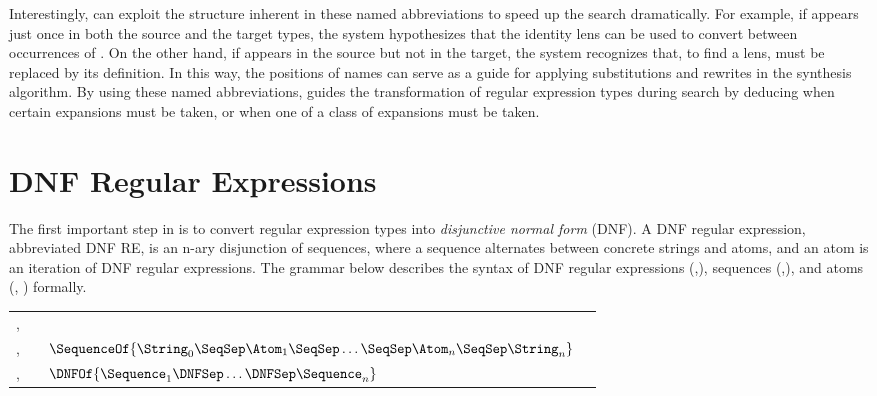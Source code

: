 \documentclass[acmsmall,screen]{acmart}
\begin{document}
Interestingly, \Optician{} can exploit the structure inherent in these named
abbreviations to speed up the search dramatically.  For example, if
\TextChar{} appears just once in both the source and the target types, the system
hypothesizes that the identity lens can be used to convert between
occurrences of \TextChar{}.  On the other hand, if \TextChar{} appears in the
source but not in the target, the system recognizes that, to find a lens,
\TextChar{} must be replaced by its
definition.  In this way, the positions of names
can serve as a guide for applying substitutions and rewrites in the
synthesis algorithm.  By using these named abbreviations, \TypeProp{} guides the 
transformation of regular expression types
during search by deducing when certain expansions must be taken, or when one of
a class of expansions must be taken.



\section{DNF Regular Expressions}
\label{sec:dnfre}

The first important step in \Optician{} is to convert
regular expression types into \emph{disjunctive normal form} (DNF).
A DNF regular expression, abbreviated DNF RE, is an n-ary disjunction of
sequences, where a sequence alternates between concrete strings and
atoms, and an atom is an iteration of DNF regular expressions.
The grammar below describes the syntax of 
DNF regular expressions (\DNFRegex{},\DNFRegexAlt{}),
sequences (\Sequence{},\SequenceAlt{}), and atoms (\Atom, \AtomAlt)
formally.

\begin{center}
  \begin{tabular}{l@{\ }c@{\ }l@{\ }>{\itshape\/}r}
    \Atom{},\AtomAlt{} & \GEq{} & \StarOf{\DNFRegex{}}
\\
    \Sequence{},\SequenceAlt{} & \GEq{} &
                                                       $\SequenceOf{\String_0\SeqSep\Atom_1\SeqSep\ldots\SeqSep\Atom_n\SeqSep\String_n}$ 
\\
    \DNFRegex{},\DNFRegexAlt{} & \GEq{} & $\DNFOf{\Sequence_1\DNFSep\ldots\DNFSep\Sequence_n}$ %
  \end{tabular}
\end{center}
\end{document}
